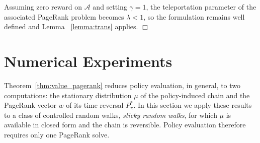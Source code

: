\documentclass[letterpaper, 10 pt, conference]{ieeeconf}
\newcommand{\A}{\mathcal{A}}
\newtheorem{corollary}{Corollary}
\begin{document}
Assuming zero reward on $\A$ and setting $\gamma=1$, the teleportation parameter of
the associated PageRank problem becomes $\lambda<1$, so the formulation remains
well defined and Lemma ~\ref{lemma:trans} applies.
\hfill $\Box$


\section{Numerical Experiments}
\label{sec:experiments}

Theorem~\ref{thm:value_pagerank} reduces policy evaluation, in general, to two computations: the stationary distribution $\mu$ of the policy-induced chain and the PageRank vector $w$ of its time reversal $P_\pi^*$. In this section we apply these results to a class of controlled random walks, \emph{sticky random walks}, for which $\mu$ is available in closed form and the chain is reversible. Policy evaluation therefore requires only one PageRank solve.

\end{document}
